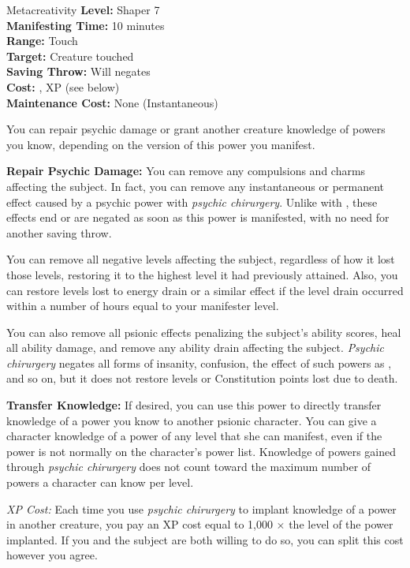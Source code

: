{Metacreativity}
{
	\textbf{Level:}
	Shaper 7\\
	\textbf{Manifesting Time:}
	10 minutes\\
	\textbf{Range:}
	Touch\\
	\textbf{Target:}
	Creature touched\\
	\textbf{Saving Throw:}
	Will negates\\
	\textbf{Cost:}
	, XP (see below)\\
	\textbf{Maintenance Cost:}
	None (Instantaneous)\\
}
{
	You can repair psychic damage or grant another creature knowledge of powers you know, depending on the version of this power you manifest.

	\textbf{Repair Psychic Damage:} You can remove any compulsions and charms affecting the subject. In fact, you can remove any instantaneous or permanent effect caused by a psychic power with \emph{psychic chirurgery}. Unlike with , these effects end or are negated as soon as this power is manifested, with no need for another saving throw.

	You can remove all negative levels affecting the subject, regardless of how it lost those levels, restoring it to the highest level it had previously attained. Also, you can restore levels lost to energy drain or a similar effect if the level drain occurred within a number of hours equal to your manifester level.

	You can also remove all psionic effects penalizing the subject's ability scores, heal all ability damage, and remove any ability drain affecting the subject. \emph{Psychic chirurgery} negates all forms of insanity, confusion, the effect of such powers as , and so on, but it does not restore levels or Constitution points lost due to death.

	\textbf{Transfer Knowledge:} If desired, you can use this power to directly transfer knowledge of a power you know to another psionic character. You can give a character knowledge of a power of any level that she can manifest, even if the power is not normally on the character's power list. Knowledge of powers gained through \emph{psychic chirurgery} does not count toward the maximum number of powers a character can know per level.

	\textit{XP Cost:} Each time you use \emph{psychic chirurgery} to implant knowledge of a power in another creature, you pay an XP cost equal to 1,000 $\times$ the level of the power implanted. If you and the subject are both willing to do so, you can split this cost however you agree.
}